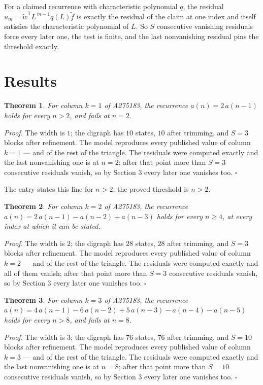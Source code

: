 \documentclass[11pt]{article}
\newtheorem{theorem}{Theorem}
\theoremstyle{definition}
\begin{document}
For a claimed recurrence with characteristic polynomial $q$, the residual $u_m = \tilde w^{\mathsf T}L^{\,m-1}q(L)\tilde f$ is exactly the residual of the claim at one index and itself satisfies the characteristic polynomial of $L$. So $S$ consecutive vanishing residuals force every later one, the test is finite, and the last nonvanishing residual pins the threshold exactly.

\section{Results}

\begin{theorem} For column $k = 1$ of A275183, the recurrence $a(n) = 2\,a(n-1)$ holds for every $n > 2$, and fails at $n = 2$.\end{theorem}

{\itshape Proof.} The width is $1$; the digraph has $10$ states, $10$ after trimming, and $S = 3$ blocks after refinement. The model reproduces every published value of column $k = 1$ --- and of the rest of the triangle. The residuals were computed exactly and the last nonvanishing one is at $n = 2$; after that point more than $S = 3$ consecutive residuals vanish, so by Section 3 every later one vanishes too. $\square$

The entry states this line for $n > 2$; the proved threshold is $n > 2$.

\begin{theorem} For column $k = 2$ of A275183, the recurrence $a(n) = 2\,a(n-1) - a(n-2) + a(n-3)$ holds for every $n \ge 4$, at every index at which it can be stated.\end{theorem}

{\itshape Proof.} The width is $2$; the digraph has $28$ states, $28$ after trimming, and $S = 3$ blocks after refinement. The model reproduces every published value of column $k = 2$ --- and of the rest of the triangle. The residuals were computed exactly and all of them vanish; after that point more than $S = 3$ consecutive residuals vanish, so by Section 3 every later one vanishes too. $\square$

\begin{theorem} For column $k = 3$ of A275183, the recurrence $a(n) = 4\,a(n-1) - 6\,a(n-2) + 5\,a(n-3) - a(n-4) - a(n-5)$ holds for every $n > 8$, and fails at $n = 8$.\end{theorem}

{\itshape Proof.} The width is $3$; the digraph has $76$ states, $76$ after trimming, and $S = 10$ blocks after refinement. The model reproduces every published value of column $k = 3$ --- and of the rest of the triangle. The residuals were computed exactly and the last nonvanishing one is at $n = 8$; after that point more than $S = 10$ consecutive residuals vanish, so by Section 3 every later one vanishes too. $\square$
\end{document}
